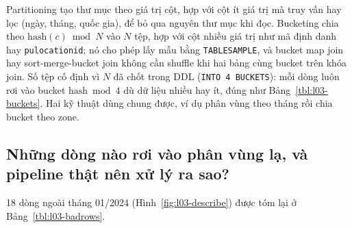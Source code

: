 \documentclass[
  12pt,
  a4paper,
]{report}
\begin{document}
Partitioning tạo thư mục theo giá trị cột, hợp với cột ít giá trị mà
truy vấn hay lọc (ngày, tháng, quốc gia), để bỏ qua nguyên thư mục khi
đọc. Bucketing chia theo \(\text{hash}(c) \bmod N\) vào \(N\) tệp, hợp
với cột nhiều giá trị như mã định danh hay \texttt{pulocationid}; nó cho
phép lấy mẫu bằng \texttt{TABLESAMPLE}, và bucket map join hay
sort-merge-bucket join không cần shuffle khi hai bảng cùng bucket trên
khóa join. Số tệp cố định vì \(N\) đã chốt trong DDL
(\texttt{INTO\ 4\ BUCKETS}): mỗi dòng luôn rơi vào bucket
\(\text{hash} \bmod 4\) dù dữ liệu nhiều hay ít, đúng như
Bảng~\ref{tbl:l03-buckets}. Hai kỹ thuật dùng chung được, ví dụ phân
vùng theo tháng rồi chia bucket theo zone.

\subsection{Những dòng nào rơi vào phân vùng lạ, và pipeline thật nên xử
lý ra sao?}\label{sec:l03-q8}

18 dòng ngoài tháng 01/2024 (Hình~\ref{fig:l03-describe}) được tóm lại ở
Bảng~\ref{tbl:l03-badrows}.
\end{document}
